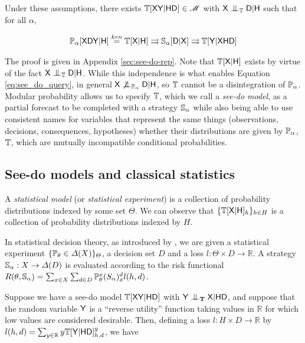 Under these assumptions, there exists $\mathbb{T}[\mathsf{X}\mathsf{Y}|\mathsf{HD}]\in \mathscr{M}$ with $\RV{X}\CI_{\model{T}}\RV{D}|\RV{H}$ such that for all $\alpha$, 

\begin{align}
    \mathbb{P}_{\alpha}[\mathsf{X}\mathsf{D}\mathsf{Y}|\mathsf{H}]\overset{krn}{=}\mathbb{T}[\mathsf{X}|\mathsf{H}]\rightrightarrows \mathbb{S}_\alpha [\mathsf{D}|\mathsf{X}] \rightrightarrows \mathbb{T}[\mathsf{Y}|\mathsf{XHD}] \label{eq:see_do_query}
\end{align}

The proof is given in Appendix \ref{sec:see-do-rep}. Note that $\mathbb{T}[\mathsf{X}|\mathsf{H}]$ exists by virtue of the fact $\RV{X}\CI_{\model{T}}\RV{D}|\RV{H}$. While this independence is what enables Equation \ref{eq:see_do_query}, in general $\RV{X}\not\CI_{\model{P}_\alpha} \RV{D}|\RV{H}$, so $\mathbb{T}$ cannot be a disintegration of $\mathbb{P}_\alpha$. Modular probability allows us to specify $\mathbb{T}$, which we call a \emph{see-do model}, as a partial forecast to be completed with a strategy $\mathbb{S}_\alpha$ while also being able to use consistent names for variables that represent the same things (observations, decisions, consequences, hypotheses) whether their distributions are given by $\mathbb{P}_\alpha$, $\mathbb{T}$, which are mutually incompatible conditional probabilities.

\subsection{See-do models and classical statistics}

A \emph{statistical model} (or \emph{statistical experiment}) is a collection of probability distributions indexed by some set $\Theta$. We can observe that $\{\mathbb{T}[\mathsf{X}|\mathsf{H}]_h\}_{h\in H}$ is a collection of probability distributions indexed by $H$.

In statistical decision theory, as introduced by \citet{wald_statistical_1950}, we are given a statistical experiment $\{\mathbb{P}_\theta\in \Delta(X)\}_\Theta$, a decision set $D$ and a loss $l:\Theta\times D\to \mathbb{R}$. A strategy $\mathbb{S}_\alpha:X\to \Delta(D)$ is evaluated according to the risk functional $R(\theta,\mathbb{S}_\alpha)=\sum_{x\in X}\sum_{d\in D} \mathbb{P}_\theta^x (S_\alpha)_x^d l(h,d)$.

Suppose we have a see-do model $\mathbb{T}[\mathsf{X}\mathsf{Y}|\mathsf{HD}]$ with $\RV{Y}\CI_{\kernel{T}} \RV{X}|\RV{HD}$, and suppose that the random variable $\mathsf{Y}$ is a ``reverse utility'' function taking values in $\mathbb{R}$ for which low values are considered desirable. Then, defining a loss $l:H\times D\to \mathbb{R}$ by $l(h,d) = \sum_{y\in \mathbb{R}} y\mathbb{T}[\mathsf{Y}|\mathsf{H}\mathsf{D}]_{h,d}^y$, we have 

